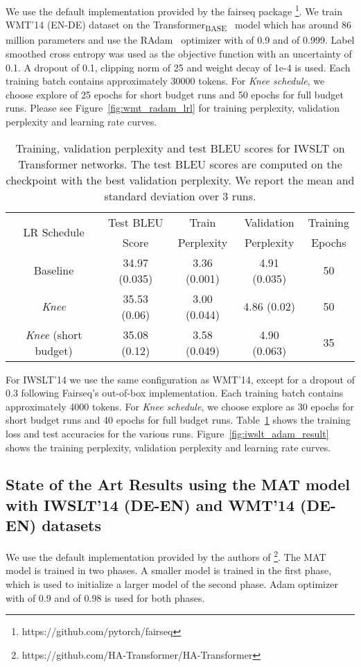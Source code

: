 \documentclass{article} \usepackage{iclr2021_conference,times}
\newcommand{\lrschedule}{\textit{Knee schedule}}
\newcommand{\lrscheduleshort}{\textit{Knee}}
\begin{document}
We use the default implementation provided by the fairseq package \cite{ott2019fairseq} \footnote{https://github.com/pytorch/fairseq}. We train WMT'14 (EN-DE) dataset on the Transformer\textsubscript{BASE}~\cite{vaswani2017attention} model which has around 86 million parameters and use the RAdam~\cite{liu2019variance_radam} optimizer with  of 0.9 and  of 0.999. Label smoothed cross entropy was used as the objective function with an uncertainty of 0.1. A dropout of 0.1, clipping norm of 25 and weight decay of 1e-4 is used. Each training batch contains approximately 30000 tokens. For \lrschedule{}, we choose explore of 25 epochs for short budget runs and 50 epochs for full budget runs. Please see Figure~\ref{fig:wmt_radam_lrl} for training perplexity, validation perplexity and learning rate curves.

\begin{table}[h!]
  \centering
  \small
\caption{Training, validation perplexity and test BLEU scores for IWSLT on Transformer networks. The test BLEU scores are computed on the checkpoint with the best validation perplexity. We report the mean and standard deviation over 3 runs.} 
\label{tab:iwslt_results}
\begin{tabular}{ccccc}
\toprule
  \multirow{2}{*}{LR Schedule} & Test BLEU  & Train & Validation  & Training \\
  &  Score & Perplexity  & Perplexity & Epochs \\ 
 \midrule
  Baseline   &  34.97 (0.035) & 3.36 (0.001) & 4.91 (0.035) & 50 \\
  \lrscheduleshort{}  & 35.53 (0.06) & 3.00 (0.044) & 4.86 (0.02) & 50 \\ 
  \lrscheduleshort{} (short budget) & 35.08 (0.12) & 3.58 (0.049) & 4.90 (0.063)  & 35\\

\bottomrule
\end{tabular}
\end{table}

For IWSLT'14 we use the same configuration as WMT'14, except for a dropout of 0.3 following Fairseq's out-of-box implementation. Each training batch contains approximately 4000 tokens. For \lrschedule{}, we choose explore as 30 epochs for short budget runs and 40 epochs for full budget runs. Table~\ref{tab:iwslt_results} shows the training loss and test accuracies for the various runs. Figure~\ref{fig:iwslt_adam_result} shows the training perplexity, validation perplexity and learning rate curves.


\subsection{State of the Art Results using the MAT model with IWSLT'14 (DE-EN) and WMT'14 (DE-EN) datasets}
\label{sec:sota_mat}
We use the default implementation provided by the authors of \cite{mat_fan2020} \footnote{https://github.com/HA-Transformer/HA-Transformer}. The MAT model is trained in two phases. A smaller model is trained in the first phase, which is used to initialize a larger model of the second phase. Adam optimizer with  of 0.9 and  of 0.98 is used for both phases.
\end{document}
